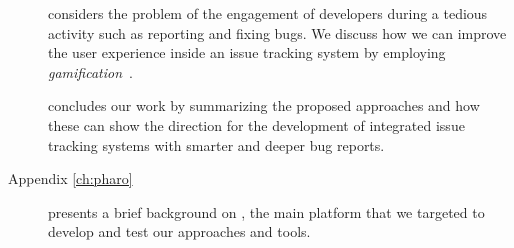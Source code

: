\begin{description}
  \item[] considers the problem of the engagement of developers during a tedious activity such as reporting and fixing bugs.
  We discuss how we can improve the user experience inside an issue tracking system by employing \emph{gamification}~\cite{DalS2017a}.

  \item[] concludes our work by summarizing the proposed approaches and how these can show the direction for the development of integrated issue tracking systems with smarter and deeper bug reports.

  \item[Appendix \ref{ch:pharo}] presents a brief background on \pha, the main platform that we targeted to develop and test our approaches and tools.

\end{description}
